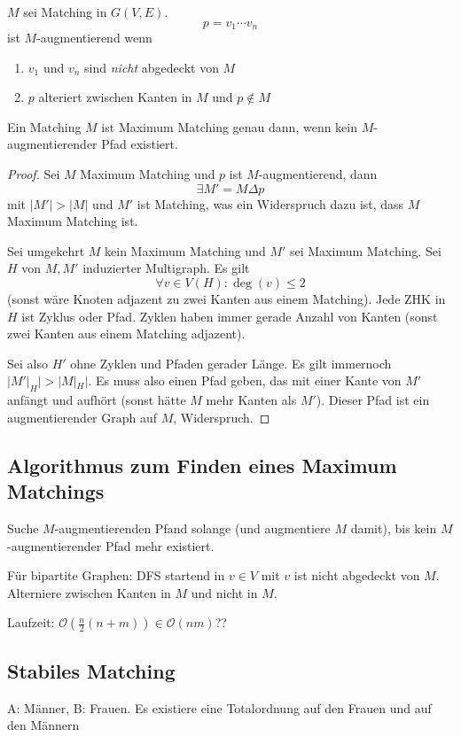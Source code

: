 \documentclass{mycourse}
\begin{document}
\begin{df}
$M$ sei Matching in $G(V,E)$.
\[
p=v_1\dotsb v_n
\]
ist $M$-augmentierend wenn
\begin{enumerate}
\item $v_1$ und $v_n$ sind \emph{nicht} abgedeckt von $M$
\item $p$ alteriert zwischen Kanten in $M$ und $p\not \in M$ 
\end{enumerate}

\end{df}

\begin{thm}[Bergel, 1957]
Ein Matching $M$ ist Maximum Matching genau dann, wenn kein $M$-augmentierender Pfad existiert.
\begin{proof}
Sei $M$ Maximum Matching und $p$ ist $M$-augmentierend, dann
\[
\exists M'=M\Delta p
\]
mit $|M'|>|M|$ und $M'$ ist Matching, was ein Widerspruch dazu ist, dass $M$ Maximum Matching ist.

Sei umgekehrt $M$ kein Maximum Matching und $M'$ sei Maximum Matching.
Sei $H$ von $M, M'$ induzierter Multigraph.
Es gilt
\[
\forall v\in V(H):\deg(v)\le 2
\]
(sonst wäre Knoten adjazent zu zwei Kanten aus einem Matching).
Jede ZHK in $H$ ist Zyklus oder Pfad.
Zyklen haben immer gerade Anzahl von Kanten (sonst zwei Kanten aus einem Matching adjazent).

Sei also $H'$ ohne Zyklen und Pfaden gerader Länge.
Es gilt immernoch $|M'|_H|>|M|_H|$.
Es muss also einen Pfad geben, das mit einer Kante von $M'$ anfängt und aufhört (sonst hätte $M$ mehr Kanten als $M'$).
Dieser Pfad ist ein augmentierender Graph auf $M$, Widerspruch.
\end{proof}
\end{thm}

\subsection{Algorithmus zum Finden eines Maximum Matchings}

Suche $M$-augmentierenden Pfand solange (und augmentiere $M$ damit), bis kein $M$-augmentierender Pfad mehr existiert.

Für bipartite Graphen:
DFS startend in $v\in V$ mit $v$ ist nicht abgedeckt von $M$.
Alterniere zwischen Kanten in $M$ und nicht in $M$.

Laufzeit: $\mathcal O(\frac n2(n+m)) \in \mathcal O(nm)$??

\subsection{Stabiles Matching}
A: Männer, B: Frauen.
Es existiere eine Totalordnung auf den Frauen und auf den Männern
\end{document}
